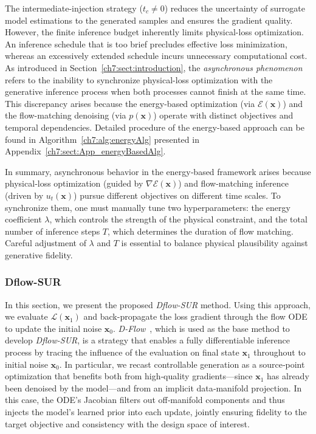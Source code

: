 The intermediate-injection strategy ($t_c \neq 0$) reduces the uncertainty of surrogate model estimations to the generated samples and ensures the gradient quality. However, the finite inference budget inherently limits physical-loss optimization. An inference schedule that is too brief precludes effective loss minimization, whereas an excessively extended schedule incurs unnecessary computational cost. As introduced in Section~\ref{ch7:sect:introduction}, the \textit{asynchronous phenomenon} refers to the inability to synchronize physical-loss optimization with the generative inference process when both processes cannot finish at the same time. This discrepancy arises because the energy-based optimization (via $\mathcal{E}(\mathbf{x})$) and the flow-matching denoising (via $p(\mathbf{x})$) operate with distinct objectives and temporal dependencies. Detailed procedure of the energy-based approach can be found in Algorithm~\ref{ch7:alg:energyAlg} presented in Appendix~\ref{ch7:sect:App_energyBasedAlg}.

In summary, asynchronous behavior in the energy‐based framework arises because physical‐loss optimization (guided by $\nabla\mathcal{E}(\mathbf{x})$) and flow‐matching inference (driven by $u_{t}(\mathbf{x})$) pursue different objectives on different time scales. To synchronize them, one must manually tune two hyperparameters: the energy coefficient $\lambda$, which controls the strength of the physical constraint, and the total number of inference steps $T$, which determines the duration of flow matching. Careful adjustment of $\lambda$ and $T$ is essential to balance physical plausibility against generative fidelity.

\subsubsection{Dflow-SUR}
\label{ch7:subsubsect:diff}
In this section, we present the proposed \textit{Dflow-SUR} method. Using this approach, we evaluate $\mathcal{L}(\mathbf{x}_1)$ and back-propagate the loss gradient through the flow ODE to update the initial noise $\mathbf{x}_0$. \textit{D-Flow}~\cite{ai.BenHamu2024}, which is used as the base method to develop \textit{Dflow-SUR}, is a strategy that enables a fully differentiable inference process by tracing the influence of the evaluation on final state $\mathbf{x}_1$ throughout to initial noise $\mathbf{x}_0$. In particular, we recast controllable generation as a source‐point optimization that benefits both from high‐quality gradients---since $\mathbf{x}_1$ has already been denoised by the model---and from an implicit data‐manifold projection. In this case, the ODE’s Jacobian filters out off‐manifold components and thus injects the model’s learned prior into each update, jointly ensuring fidelity to the target objective and consistency with the design space of interest.
 
